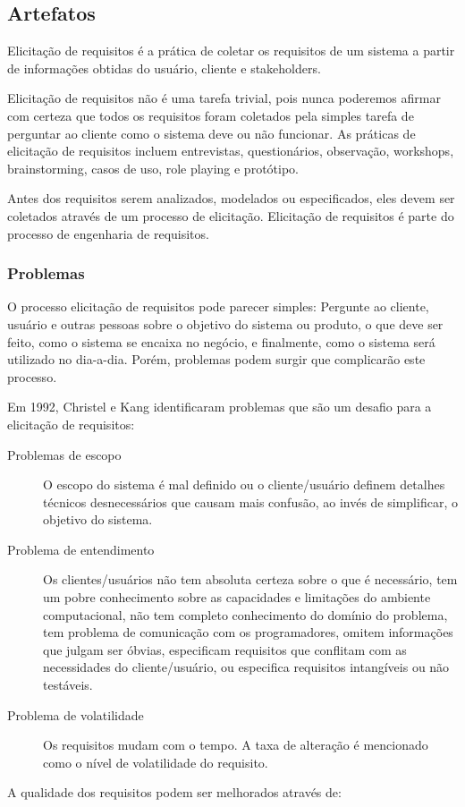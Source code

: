 \subsection{Artefatos}

Elicitação de requisitos é a prática de coletar os requisitos de um sistema a partir de informações obtidas do usuário, cliente e stakeholders. 

Elicitação de requisitos não é uma tarefa trivial, pois nunca poderemos afirmar com certeza que todos os requisitos foram coletados pela simples tarefa de perguntar ao cliente como o sistema deve ou não funcionar. As práticas de elicitação de requisitos incluem entrevistas, questionários, observação, workshops, brainstorming, casos de uso, role playing e protótipo.

Antes dos requisitos serem analizados, modelados ou especificados, eles devem ser coletados através de um processo de elicitação. Elicitação de requisitos é parte do processo de engenharia de requisitos.

\subsubsection{Problemas}

O processo elicitação de requisitos pode parecer simples: Pergunte ao cliente, usuário e outras pessoas sobre o objetivo do sistema ou produto, o que deve ser feito, como o sistema se encaixa no negócio, e finalmente, como o sistema será utilizado no dia-a-dia. Porém, problemas podem surgir que complicarão este processo.


Em 1992, Christel e Kang \cite{ChristelIssuesin1992} identificaram problemas que são um desafio para a elicitação de requisitos:

\begin{description}
\item [Problemas de escopo] O escopo do sistema é mal definido ou o cliente/usuário definem detalhes técnicos desnecessários que causam mais confusão, ao invés de simplificar, o objetivo do sistema.

\item [Problema de entendimento] Os clientes/usuários não tem absoluta certeza sobre o que é necessário, tem um pobre conhecimento sobre as capacidades e limitações do ambiente computacional, não tem completo conhecimento do domínio do problema, tem problema de comunicação com os programadores, omitem informações que julgam ser óbvias, especificam requisitos que conflitam com as necessidades do cliente/usuário, ou especifica requisitos intangíveis ou não testáveis.

\item[Problema de volatilidade] Os requisitos mudam com o tempo. A taxa de alteração é mencionado como o nível de volatilidade do requisito.

\end{description}
A qualidade dos requisitos podem ser melhorados através de:

